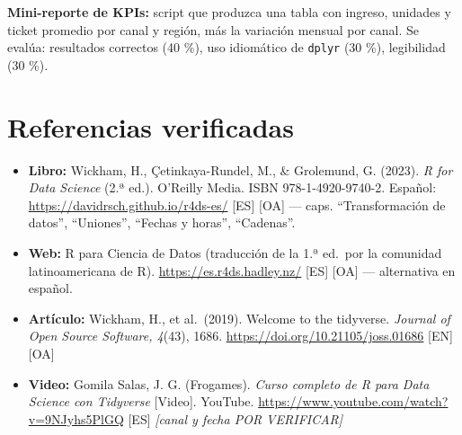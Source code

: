 \textbf{Mini-reporte de KPIs:} script que produzca una tabla con
ingreso, unidades y ticket promedio por canal y región, más la variación
mensual por canal. Se evalúa: resultados correctos (40 \%), uso
idiomático de \passthrough{\lstinline!dplyr!} (30 \%), legibilidad (30
\%).

\section{Referencias verificadas}

\begin{itemize}
\tightlist
\item
  \textbf{Libro:} Wickham, H., Çetinkaya-Rundel, M., \& Grolemund, G.
  (2023). \emph{R for Data Science} (2.ª ed.). O'Reilly Media. ISBN
  978-1-4920-9740-2. Español: \url{https://davidrsch.github.io/r4ds-es/}
  {[}ES{]} {[}OA{]} --- caps. ``Transformación de datos'', ``Uniones'',
  ``Fechas y horas'', ``Cadenas''.
\item
  \textbf{Web:} R para Ciencia de Datos (traducción de la 1.ª ed.~por la
  comunidad latinoamericana de R). \url{https://es.r4ds.hadley.nz/}
  {[}ES{]} {[}OA{]} --- alternativa en español.
\item
  \textbf{Artículo:} Wickham, H., et al.~(2019). Welcome to the
  tidyverse. \emph{Journal of Open Source Software, 4}(43), 1686.
  \url{https://doi.org/10.21105/joss.01686} {[}EN{]} {[}OA{]}
\item
  \textbf{Video:} Gomila Salas, J. G. (Frogames). \emph{Curso completo
  de R para Data Science con Tidyverse} {[}Video{]}. YouTube.
  \url{https://www.youtube.com/watch?v=9NJyhs5PlGQ} {[}ES{]}
  \emph{{[}canal y fecha POR VERIFICAR{]}}
\end{itemize}
